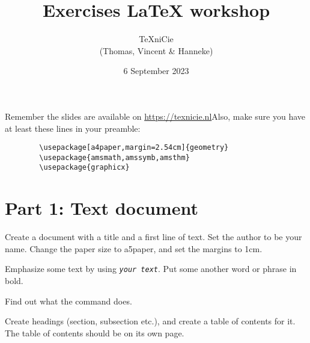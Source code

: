 \documentclass[a4paper]{article}
\title{\vspace{-65pt} Exercises LaTeX workshop}
\author{\TeX niCie\\
{\small (Thomas, Vincent \& Hanneke)}
}
\date{6 September 2023}
\begin{document}
\maketitle


Remember the slides are available on \url{https://texnicie.nl}\quad Also, make sure you have at least these lines in your preamble:
\begin{verbatim}
        \usepackage[a4paper,margin=2.54cm]{geometry}
        \usepackage{amsmath,amssymb,amsthm}
        \usepackage{graphicx}
    \end{verbatim}

\section{Part 1: Text document}

\begin{exercise}
    Create a document with a title and a first line of text. Set the author to
    be your name. Change the paper size to a5paper, and set the margins to 1cm.
\end{exercise}

\begin{exercise}[emphasize]
    Emphasize some text by using \texttt{\emph{your text}}. Put some another word
    or phrase in bold.
    
\end{exercise}

\begin{exercise}[flushright]
    Find out what the \texttt{\flushright} command does.
\end{exercise}

\begin{exercise}[headings]
    Create headings (section, subsection etc.), and create
    a table of contents for it. The table of contents should be on its own page.
\end{exercise}
\end{document}
